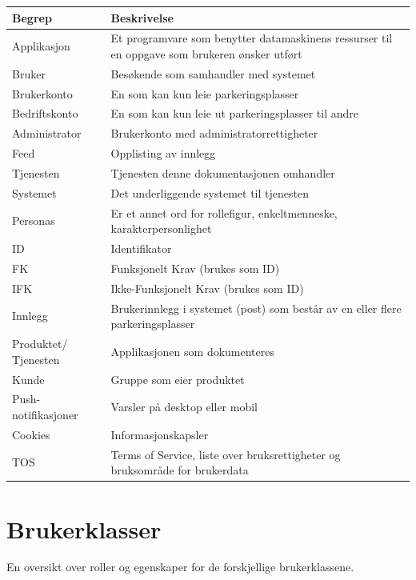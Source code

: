 \documentclass[12pt]{article}
\begin{document}
\begin{center}
    \begin{tabular}{|p{4cm}|p{12cm}|} 
        \hline
        \bf Begrep & \bf Beskrivelse\\
        \hline
        Applikasjon &  Et programvare som benytter datamaskinens ressurser til en oppgave som brukeren ønsker utført\\
        \hline
        Bruker & Besøkende som samhandler med systemet\\
        \hline
        Brukerkonto & En som kan kun leie parkeringsplasser\\
        \hline
        Bedriftskonto & En som kan kun leie ut parkeringsplasser til andre\\
        \hline
        Administrator & Brukerkonto med administratorrettigheter\\
        \hline
        Feed & Opplisting av innlegg\\
        \hline
        Tjenesten & Tjenesten denne dokumentasjonen omhandler\\
        \hline
        Systemet & Det underliggende systemet til tjenesten\\
        \hline
        Personas & Er et annet ord for rollefigur, enkeltmenneske, karakterpersonlighet\\
        \hline
        ID & Identifikator\\
        \hline
        FK & Funksjonelt Krav (brukes som ID)\\
        \hline
        IFK & Ikke-Funksjonelt Krav (brukes som ID)\\
        \hline
        Innlegg & Brukerinnlegg i systemet (post) som består av en eller flere parkeringsplasser\\
        \hline
        Produktet/ Tjenesten & Applikasjonen som dokumenteres\\
        \hline
        Kunde & Gruppe som eier produktet\\
        \hline
        Push-notifikasjoner & Varsler på desktop eller mobil \\
        \hline
        Cookies & Informasjonskapsler \\
        \hline
        TOS & Terms of Service, liste over bruksrettigheter og bruksområde for brukerdata \\
    \end{tabular}
\end{center}

\section{Brukerklasser}
En oversikt over roller og egenskaper for de forskjellige brukerklassene.
\end{document}
